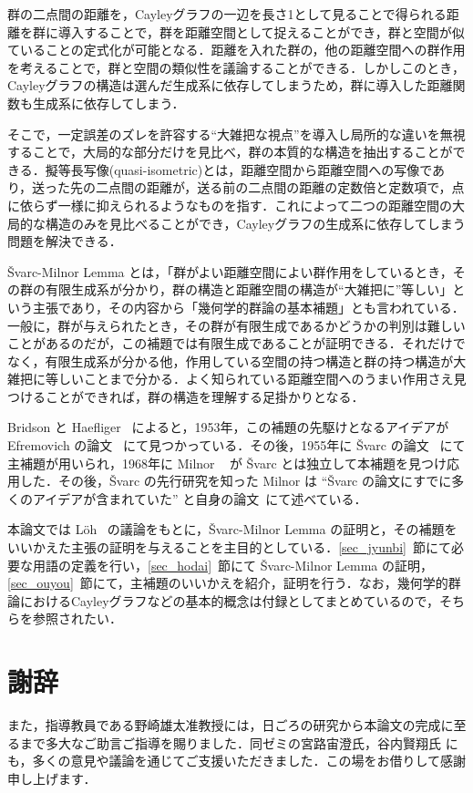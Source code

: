 \documentclass[dvipdfmx]{ujarticle}
\theoremstyle{definition}
\begin{document}
群の二点間の距離を，Cayleyグラフの一辺を長さ1として見ることで得られる距離を群に導入することで，群を距離空間として捉えることができ，群と空間が似ていることの定式化が可能となる．距離を入れた群の，他の距離空間への群作用を考えることで，群と空間の類似性を議論することができる．しかしこのとき，Cayleyグラフの構造は選んだ生成系に依存してしまうため，群に導入した距離関数も生成系に依存してしまう．

そこで，一定誤差のズレを許容する``大雑把な視点''を導入し局所的な違いを無視することで，大局的な部分だけを見比べ，群の本質的な構造を抽出することができる．擬等長写像(quasi-isometric)とは，距離空間から距離空間への写像であり，送った先の二点間の距離が，送る前の二点間の距離の定数倍と定数項で，点に依らず一様に抑えられるようなものを指す．これによって二つの距離空間の大局的な構造のみを見比べることができ，Cayleyグラフの生成系に依存してしまう問題を解決できる．

Švarc-Milnor Lemma とは，「群がよい距離空間によい群作用をしているとき，その群の有限生成系が分かり，群の構造と距離空間の構造が``大雑把に''等しい」という主張であり，その内容から「幾何学的群論の基本補題」とも言われている．一般に，群が与えられたとき，その群が有限生成であるかどうかの判別は難しいことがあるのだが，この補題では有限生成であることが証明できる．それだけでなく，有限生成系が分かる他，作用している空間の持つ構造と群の持つ構造が大雑把に等しいことまで分かる．よく知られている距離空間へのうまい作用さえ見つけることができれば，群の構造を理解する足掛かりとなる．

Bridson と Haefliger~\cite{10} によると，1953年，この補題の先駆けとなるアイデアが Efremovich の論文~\cite{6} にて見つかっている．その後，1955年に Švarc の論文 ~\cite{3}にて主補題が用いられ，1968年に Milnor ~\cite[Theorem 2]{4} が Švarc とは独立して本補題を見つけ応用した．その後，Švarc の先行研究を知った Milnor は ``Švarc の論文にすでに多くのアイデアが含まれていた'' と自身の論文~\cite{5}にて述べている．

本論文では Löh~\cite[Section 5]{1} の議論をもとに，Švarc-Milnor Lemma の証明と，その補題をいいかえた主張の証明を与えることを主目的としている．\ref{sec_jyunbi}~節にて必要な用語の定義を行い，\ref{sec_hodai}~節にて Švarc-Milnor Lemma の証明，\ref{sec_ouyou}~節にて，主補題のいいかえを紹介，証明を行う．なお，幾何学的群論におけるCayleyグラフなどの基本的概念は付録としてまとめているので，そちらを参照されたい．

\section*{謝辞}
また，指導教員である野崎雄太准教授には，日ごろの研究から本論文の完成に至るまで多大なご助言ご指導を賜りました．同ゼミの宮路宙澄氏，谷内賢翔氏
にも，多くの意見や議論を通じてご支援いただきました．この場をお借りして感謝申し上げます．
\end{document}

